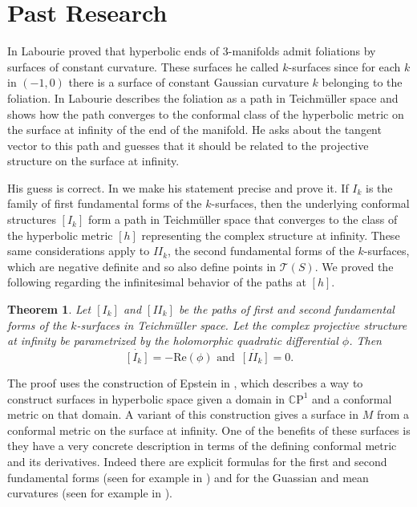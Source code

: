 \documentclass[11pt]{amsart}
\newcommand{\CP}{\mathbb{C}\mathrm{P}}
\newtheorem{thm}{Theorem}[section]
\begin{document}
\section{Past Research}
In \cite{labourie1991} Labourie proved that hyperbolic ends of 3-manifolds admit foliations by surfaces of constant curvature. These surfaces he called $k$-surfaces since for each $k$ in $(-1,0)$ there is a surface of constant Gaussian curvature $k$ belonging to the foliation. In \cite{labourie1992} Labourie describes the foliation as a path in Teichm\"uller space and shows how the path converges to the conformal class of the hyperbolic metric on the surface at infinity of the end of the manifold. He asks about the tangent vector to this path and guesses that it should be related to the projective structure on the surface at infinity. 

His guess is correct. In \cite{quinn2019} we make his statement precise and prove it. If $I_k$ is the family of first fundamental forms of the $k$-surfaces, then the underlying conformal structures $[I_k]$ form a path in Teichm\"uller space that converges to the class of the hyperbolic metric $[h]$ representing the complex structure at infinity. These same considerations apply to $I\!I_k$, the second fundamental forms of the $k$-surfaces, which are negative definite and so also define points in $\mathcal{T}(S)$. We proved the following regarding the infinitesimal behavior of the paths at $[h]$.

\begin{thm}
\label{k-surfaces-thm}
Let $[I_k]$ and $[I\!I_k]$ be the paths of first and second fundamental forms of the $k$-surfaces in Teichm\"uller space. Let the complex projective structure at infinity be parametrized by the holomorphic quadratic differential $\phi$. Then 
\[
\dot{[I_k]} = -\mathrm{Re}(\phi) \text{ and } \, \dot{[I\!I_k]} = 0.
\]
\end{thm}

The proof uses the construction of Epstein in \cite{epstein1984}, which describes a way to construct surfaces in hyperbolic space given a domain in $\CP^1$ and a conformal metric on that domain. A variant of this construction gives a surface in $M$ from a conformal metric on the surface at infinity. One of the benefits of these surfaces is they have a very concrete description in terms of the defining conformal metric and its derivatives. Indeed there are explicit formulas for the first and second fundamental forms (seen for example in \cite{dumas2017}) and for the Guassian and mean curvatures (seen for example in \cite{quinn2019}). 
\end{document}
